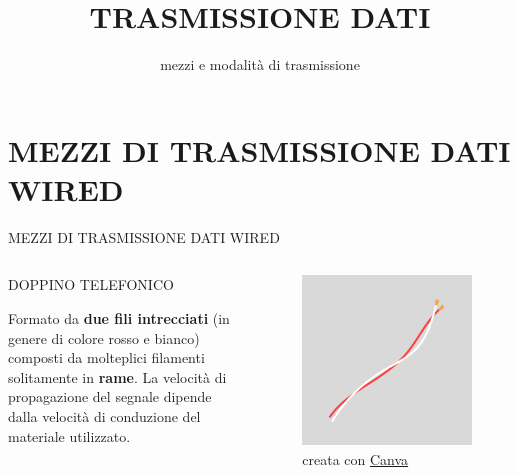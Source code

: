 \documentclass[aspectratio=1610,handout]{beamer}
\title{TRASMISSIONE DATI}
\subtitle{mezzi e modalità di trasmissione}
\date{}
\institute{\textit{
        Fonti:
        \begin{itemize}
            \item[-] \href{https://it.wikipedia.org/wiki/Sistema_di_trasmissione_(telecomunicazioni)}{Wikipedia}
            \item[-] \href{https://www.edises.it/concorsi/scienze-e-tecnologie-informatiche-2020.html}{Manuale scienze e tecnologie informatiche}
            \item[-] \href{https://www.fastweb.it/fastweb-plus/digital-magazine/spettro-elettromagnetico-bande-di-frequenza-delle-telecomunicazioni/}{Fastweb Plus}
        \end{itemize}
    }
}
\begin{document}
\begin{frame}
    \titlepage
\end{frame}


\section{MEZZI DI TRASMISSIONE DATI WIRED}

\begin{frame}{MEZZI DI TRASMISSIONE DATI WIRED}
    \begin{columns}
        \begin{alertblock}{DOPPINO TELEFONICO}
            \begin{minipage}{0.97\linewidth}
                \justifying
                Formato da \textbf{due fili intrecciati} (in genere di colore rosso e bianco) composti da 
                molteplici filamenti solitamente in \textbf{rame}. La velocità di propagazione del segnale 
                dipende dalla velocità di conduzione del materiale utilizzato.
            \end{minipage}
        \end{alertblock}
           \begin{figure}
               \includegraphics[width=\linewidth]{img/doppino_telefonico.png}
               \caption{{creata con \href{https://www.canva.com/}{Canva}}}
           \end{figure}
    \end{columns}
\end{frame}
\end{document}
